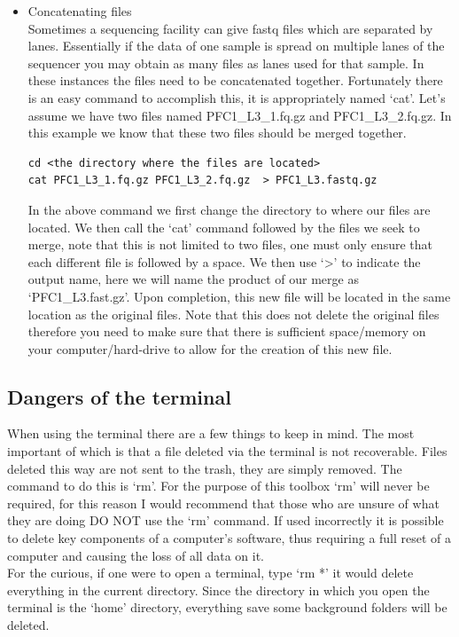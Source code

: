 \begin{itemize}
\item Concatenating files\\
Sometimes a sequencing facility can give fastq files which are separated by lanes. Essentially if the data of one sample is spread on multiple lanes of the sequencer you may obtain as many files as lanes used for that sample. In these instances the files need to be concatenated together. Fortunately there is an easy command to accomplish this, it is appropriately named `cat'. Let's assume we have two files named PFC1\_L3\_1.fq.gz and PFC1\_L3\_2.fq.gz. In this example we know that these two files should be merged together.
\begin{lstlisting}
cd <the directory where the files are located>
cat PFC1_L3_1.fq.gz PFC1_L3_2.fq.gz  > PFC1_L3.fastq.gz
\end{lstlisting}
In the above command we first change the directory to where our files are located. We then call the `cat' command followed by the files we seek to merge, note that this is not limited to two files, one must only ensure that each different file is followed by a space. We then use `>' to indicate the output name, here we will name the product of our merge as `PFC1\_L3.fast.gz'. Upon completion, this new file will be located in the same location as the original files. Note that this does not delete the original files therefore you need to make sure that there is sufficient space/memory on your computer/hard-drive to allow for the creation of this new file.
\end{itemize}

\subsection{Dangers of the terminal}
When using the terminal there are a few things to keep in mind. The most important of which is that a file deleted via the terminal is not recoverable. Files deleted this way are not sent to the trash, they are simply removed. The command to do this is `rm'. For the purpose of this toolbox `rm' will never be required, for this reason I would recommend that those who are unsure of what they are doing DO NOT use the `rm' command. If used incorrectly it is possible to delete key components of a computer's software, thus requiring a full reset of a computer and causing the loss of all data on it.\\
For the curious, if one were to open a terminal, type `rm *' it would delete everything in the current directory. Since the directory in which you open the terminal is the `home' directory, everything save some background folders will be deleted.

